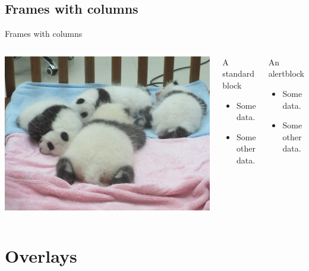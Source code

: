 \documentclass[11pt]{beamer}
\begin{document}
\subsection{Frames with columns}
\begin{frame}{Frames with columns}
    \begin{columns}[c] %
        \includegraphics[width = 1.\textwidth]{../figures/panda_puppies}
        \begin{block}{A standard block}
            \begin{itemize}
                \item Some data.
                \item Some other data.
            \end{itemize}
        \end{block}

        \begin{alertblock}{An alertblock}
            \begin{itemize}
                \item Some data.
                \item Some other data.
            \end{itemize}
        \end{alertblock}
    \end{columns}
\end{frame}

\section{Overlays}
\end{document}

